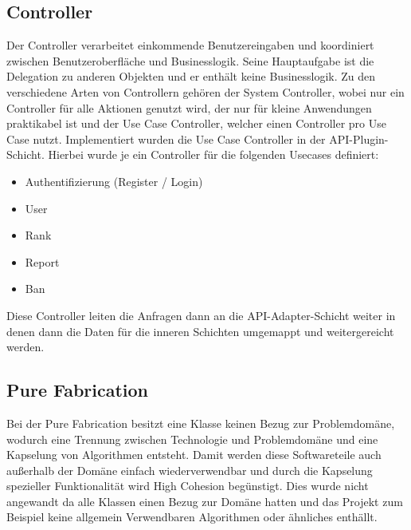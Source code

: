 \subsection{Controller}
Der Controller verarbeitet einkommende Benutzereingaben und koordiniert zwischen Benutzeroberfläche und Businesslogik.
Seine Hauptaufgabe ist die Delegation zu anderen Objekten und er enthält keine Businesslogik.
Zu den verschiedene Arten von Controllern gehören der System Controller, wobei nur ein Controller für alle Aktionen genutzt wird, der nur für kleine Anwendungen praktikabel ist
und der Use Case Controller, welcher einen Controller pro Use Case nutzt.
Implementiert wurden die Use Case Controller in der API-Plugin-Schicht.
Hierbei wurde je ein Controller für die folgenden Usecases definiert:

\begin{itemize}
    \item Authentifizierung (Register / Login)
    \item User
    \item Rank
    \item Report
    \item Ban
\end{itemize}

Diese Controller leiten die Anfragen dann an die API-Adapter-Schicht weiter in denen dann die Daten für die inneren Schichten umgemappt und weitergereicht werden.

\subsection{Pure Fabrication}
Bei der Pure Fabrication besitzt eine Klasse keinen Bezug zur Problemdomäne, wodurch eine Trennung zwischen Technologie und Problemdomäne und eine Kapselung von Algorithmen entsteht.
Damit werden diese Softwareteile auch außerhalb der Domäne einfach wiederverwendbar und durch die Kapselung spezieller Funktionalität wird High Cohesion begünstigt.
Dies wurde nicht angewandt da alle Klassen einen Bezug zur Domäne hatten und das Projekt zum Beispiel keine allgemein Verwendbaren Algorithmen oder ähnliches enthällt.
